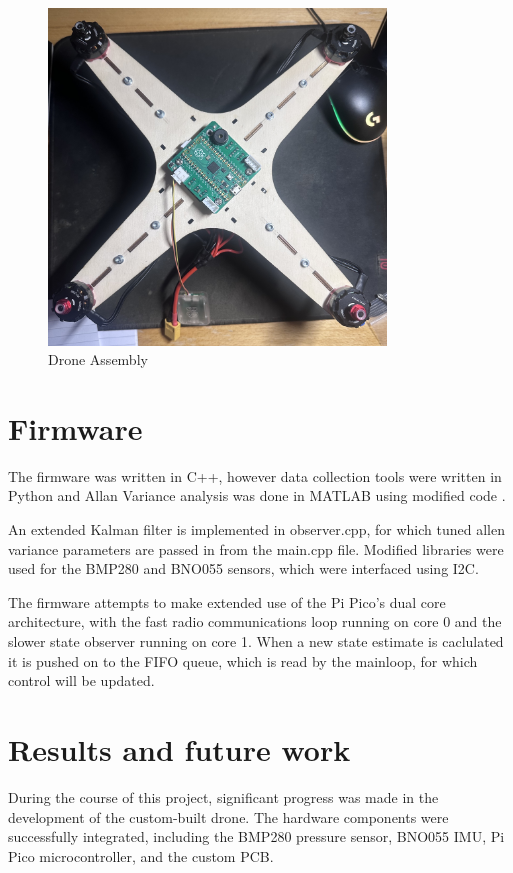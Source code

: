 \documentclass{article}
\begin{document}
\begin{figure}[H]
    \centering
    \includegraphics[width=0.8\textwidth]{built.jpg}
    \caption{Drone Assembly}
\end{figure}

\section{Firmware}

The firmware was written in C++, however data collection tools were written in Python and Allan Variance analysis was done in MATLAB using modified code \cite{error_modelling}.

An extended Kalman filter is implemented in observer.cpp, for which tuned allen variance parameters are passed in from the main.cpp file.
Modified libraries were used for the BMP280 and BNO055 sensors, which were interfaced using I2C.

The firmware attempts to make extended use of the Pi Pico's dual core architecture, with the fast radio communications loop running on core 0 and the slower state observer running on core 1.
When a new state estimate is caclulated it is pushed on to the FIFO queue, which is read by the mainloop, for which control will be updated.

\section{Results and future work}

During the course of this project, significant progress was made in the development of the custom-built drone. The hardware components were successfully integrated, including the BMP280 pressure sensor, BNO055 IMU, Pi Pico microcontroller, and the custom PCB. 
\end{document}
